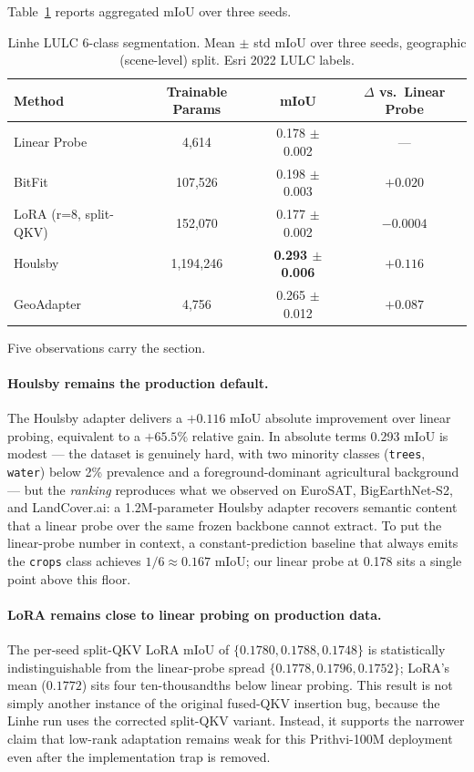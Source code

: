 Table~\ref{tab:linhe-lulc} reports aggregated mIoU over three seeds.

\begin{table}[h]
\centering
\small
\caption{Linhe LULC 6-class segmentation. Mean $\pm$ std mIoU over three seeds, geographic (scene-level) split. Esri 2022 LULC labels.}
\label{tab:linhe-lulc}
\begin{tabular}{lccc}
\toprule
Method & Trainable Params & mIoU & $\Delta$ vs.\ Linear Probe \\
\midrule
Linear Probe & 4{,}614       & 0.178 $\pm$ 0.002 & --- \\
BitFit       & 107{,}526     & 0.198 $\pm$ 0.003 & $+0.020$ \\
LoRA (r=8, split-QKV) & 152{,}070 & 0.177 $\pm$ 0.002 & $-0.0004$ \\
Houlsby      & 1{,}194{,}246 & \textbf{0.293 $\pm$ 0.006} & $\mathbf{+0.116}$ \\
GeoAdapter   & 4{,}756       & 0.265 $\pm$ 0.012 & $+0.087$ \\
\bottomrule
\end{tabular}
\end{table}

Five observations carry the section.

\paragraph{Houlsby remains the production default.} The Houlsby adapter delivers a $+0.116$ mIoU absolute improvement over linear probing, equivalent to a $+65.5\%$ relative gain. In absolute terms 0.293 mIoU is modest --- the dataset is genuinely hard, with two minority classes (\texttt{trees}, \texttt{water}) below 2\% prevalence and a foreground-dominant agricultural background --- but the \emph{ranking} reproduces what we observed on EuroSAT, BigEarthNet-S2, and LandCover.ai: a 1.2M-parameter Houlsby adapter recovers semantic content that a linear probe over the same frozen backbone cannot extract. To put the linear-probe number in context, a constant-prediction baseline that always emits the \texttt{crops} class achieves $1/6 \approx 0.167$ mIoU; our linear probe at 0.178 sits a single point above this floor.

\paragraph{LoRA remains close to linear probing on production data.} The per-seed split-QKV LoRA mIoU of $\{0.1780, 0.1788, 0.1748\}$ is statistically indistinguishable from the linear-probe spread $\{0.1778, 0.1796, 0.1752\}$; LoRA's mean ($0.1772$) sits four ten-thousandths below linear probing. This result is not simply another instance of the original fused-QKV insertion bug, because the Linhe run uses the corrected split-QKV variant. Instead, it supports the narrower claim that low-rank adaptation remains weak for this Prithvi-100M deployment even after the implementation trap is removed.

